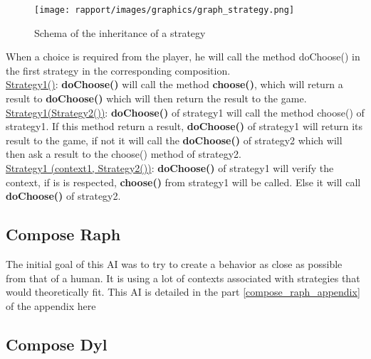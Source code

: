             \begin{figure}[H]
                \centering
                \texttt{[image: rapport/images/graphics/graph\_strategy.png]}
                \caption{Schema of the inheritance of a strategy}
            \end{figure}
            
            
            When a choice is required from the player, he will call the method doChoose() in the first strategy in the corresponding composition.\\
            
            \underline{Strategy1()}: \textbf{doChoose()} will call the method \textbf{choose()}, which will return a result to \textbf{doChoose()} which will then return the result to the game. \\
            
            \underline{Strategy1(Strategy2())}: \textbf{doChoose()} of strategy1 will call the method choose() of strategy1.
            If this method return a result, \textbf{doChoose()} of strategy1 will return its result to the game, if not it will call the \textbf{doChoose()} of strategy2 which will then ask a result to the choose() method of strategy2.\\
            
            \underline{Strategy1 (context1, Strategy2())}: \textbf{doChoose()} of strategy1 will verify the context, if is is respected, \textbf{choose()} from strategy1 will be called. Else it will call \textbf{doChoose()} of strategy2.
            
        
            \subsection{Compose Raph}
            The initial goal of this AI was to try to create a behavior as close as possible from that of a human. It is using a lot of contexts associated with strategies that would theoretically fit. This AI is detailed in the part \ref{compose_raph_appendix} of the appendix here
            
            
            \subsection{Compose Dyl}
            
